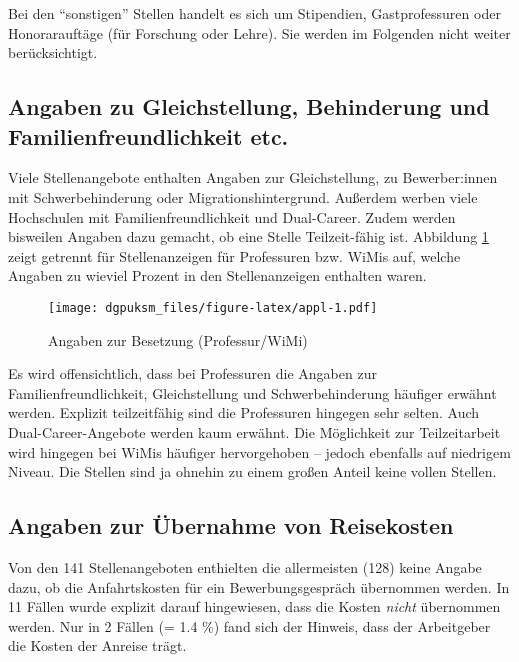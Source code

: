 \documentclass[
]{article}
\begin{document}
Bei den ``sonstigen'' Stellen handelt es sich um Stipendien, Gastprofessuren oder Honorarauftäge (für Forschung oder Lehre). Sie werden im Folgenden nicht weiter berücksichtigt.

\hypertarget{angaben-zu-gleichstellung-behinderung-und-familienfreundlichkeit-etc.}{%
\subsection{Angaben zu Gleichstellung, Behinderung und Familienfreundlichkeit etc.}\label{angaben-zu-gleichstellung-behinderung-und-familienfreundlichkeit-etc.}}

Viele Stellenangebote enthalten Angaben zur Gleichstellung, zu Bewerber:innen mit Schwerbehinderung oder Migrationshintergrund. Außerdem werben viele Hochschulen mit Familienfreundlichkeit und Dual-Career. Zudem werden bisweilen Angaben dazu gemacht, ob eine Stelle Teilzeit-fähig ist. Abbildung \ref{fig:appl} zeigt getrennt für Stellenanzeigen für Professuren bzw. WiMis auf, welche Angaben zu wieviel Prozent in den Stellenanzeigen enthalten waren.

\begin{figure}
\centering
\texttt{[image: dgpuksm\_files/figure-latex/appl-1.pdf]}
\caption{\label{fig:appl}Angaben zur Besetzung (Professur/WiMi)}
\end{figure}

Es wird offensichtlich, dass bei Professuren die Angaben zur Familienfreundlichkeit, Gleichstellung und Schwerbehinderung häufiger erwähnt werden. Explizit teilzeitfähig sind die Professuren hingegen sehr selten. Auch Dual-Career-Angebote werden kaum erwähnt. Die Möglichkeit zur Teilzeitarbeit wird hingegen bei WiMis häufiger hervorgehoben -- jedoch ebenfalls auf niedrigem Niveau. Die Stellen sind ja ohnehin zu einem großen Anteil keine vollen Stellen.

\hypertarget{angaben-zur-uxfcbernahme-von-reisekosten}{%
\subsection{Angaben zur Übernahme von Reisekosten}\label{angaben-zur-uxfcbernahme-von-reisekosten}}

Von den 141 Stellenangeboten enthielten die allermeisten (128) keine Angabe dazu, ob die Anfahrtskosten für ein Bewerbungsgespräch übernommen werden. In 11 Fällen wurde explizit darauf hingewiesen, dass die Kosten \emph{nicht} übernommen werden. Nur in 2 Fällen (= 1.4 \%) fand sich der Hinweis, dass der Arbeitgeber die Kosten der Anreise trägt.
\end{document}

